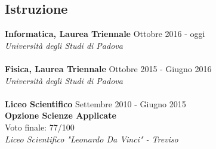 \documentclass[margin, 10pt]{res}
\begin{document}
\begin{resume}
\section{Istruzione}
\textbf{Informatica, Laurea Triennale} \hfill Ottobre 2016 - oggi \\
\textit{Università degli Studi di Padova} \\ \\
\textbf{Fisica, Laurea Triennale} \hfill Ottobre 2015 - Giugno 2016 \\
\textit{Università degli Studi di Padova} \\ \\
\textbf{Liceo Scientifico} \hfill Settembre 2010 - Giugno 2015 \\
\textbf{Opzione Scienze Applicate} \\
Voto finale: 77/100 \\
\textit{Liceo Scientifico "Leonardo Da Vinci" - Treviso} 



\end{resume}
\end{document}
